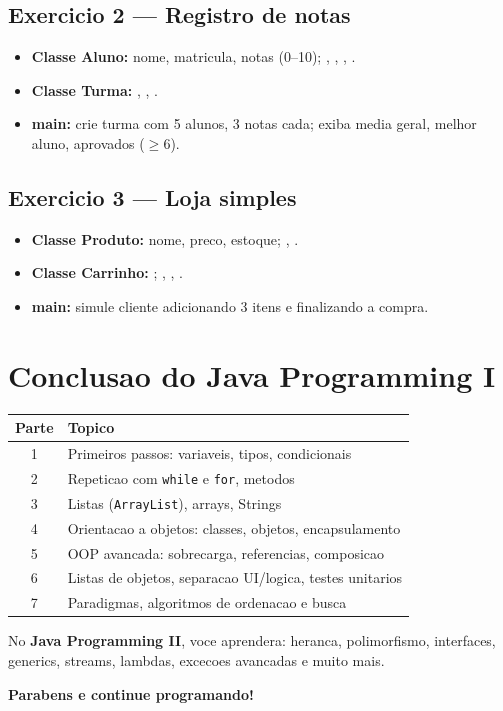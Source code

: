 \documentclass[11pt,a4paper]{article}
\begin{document}
\subsection{Exercicio 2 --- Registro de notas}

\begin{itemize}
  \item \textbf{Classe Aluno:} nome, matricula, notas (0--10); , , , .
  \item \textbf{Classe Turma:} , , .
  \item \textbf{main:} crie turma com 5 alunos, 3 notas cada; exiba media geral, melhor aluno, aprovados ($\geq 6$).
\end{itemize}

\subsection{Exercicio 3 --- Loja simples}

\begin{itemize}
  \item \textbf{Classe Produto:} nome, preco, estoque; , .
  \item \textbf{Classe Carrinho:} ; , , .
  \item \textbf{main:} simule cliente adicionando 3 itens e finalizando a compra.
\end{itemize}

\section{Conclusao do Java Programming I}

\begin{center}
\begin{longtable}{c l}
\toprule
\textbf{Parte} & \textbf{Topico} \\
\midrule
1 & Primeiros passos: variaveis, tipos, condicionais \\
2 & Repeticao com \texttt{while} e \texttt{for}, metodos \\
3 & Listas (\texttt{ArrayList}), arrays, Strings \\
4 & Orientacao a objetos: classes, objetos, encapsulamento \\
5 & OOP avancada: sobrecarga, referencias, composicao \\
6 & Listas de objetos, separacao UI/logica, testes unitarios \\
7 & Paradigmas, algoritmos de ordenacao e busca \\
\bottomrule
\end{longtable}
\end{center}

No \textbf{Java Programming II}, voce aprendera: heranca, polimorfismo, interfaces, generics, streams, lambdas, excecoes avancadas e muito mais.

\bigskip
\begin{center}
  {\large\sffamily\bfseries\color{javaOrange} Parabens e continue programando!}
\end{center}
\end{document}
